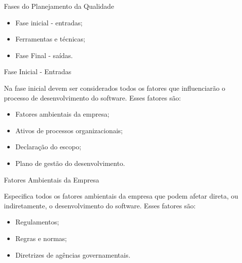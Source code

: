\documentclass[xcolor=x11names,compress]{beamer}
\begin{document}
\begin{frame}{Fases do Planejamento da Qualidade}

\begin{itemize}
\itemsep 5mm

\item Fase inicial - entradas;

\item Ferramentas e técnicas;

\item Fase Final - saídas.

\end{itemize}

\end{frame}

\begin{frame}{Fase Inicial - Entradas}

Na fase inicial devem ser considerados todos os fatores que influenciarão o processo de desenvolvimento do software. Esses fatores são:

\begin{itemize}
\itemsep 5mm

\item Fatores ambientais da empresa;

\item Ativos de processos organizacionais;

\item Declaração do escopo;

\item Plano de gestão do desenvolvimento.

\end{itemize}

\end{frame}

\begin{frame}{Fatores Ambientais da Empresa}

Especifica todos os fatores ambientais da empresa que podem afetar direta, ou indiretamente, o desenvolvimento do software. Esses fatores são:

\begin{itemize}
\itemsep 5mm 

\item Regulamentos;

\item Regras e normas;

\item Diretrizes de agências governamentais.

\end{itemize}

\end{frame}
\end{document}
